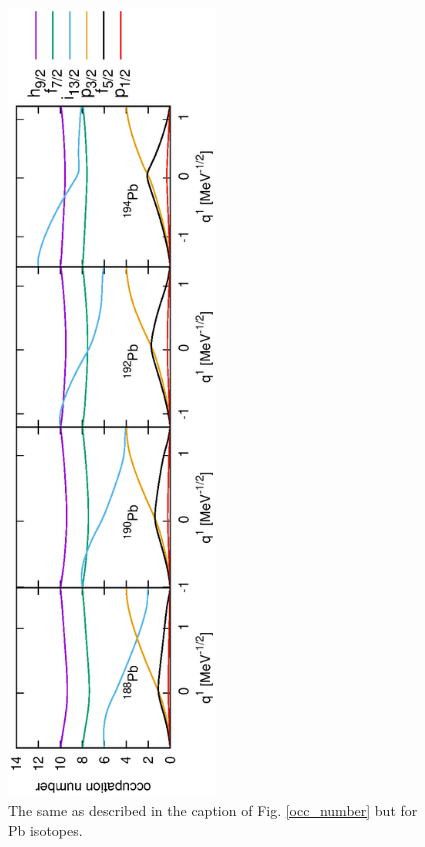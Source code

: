 \documentclass[11pt]{book} %
\begin{document}
\begin{figure}[tb]
 \begin{center}
  \includegraphics[width=55mm,angle=-90]{images/Pbocc_number.eps}
 \end{center}
	\caption{The same as described in the caption of Fig. \ref{occ_number} but for Pb isotopes.
}
 \label{Pb_occ_number}
\end{figure}
\end{document}
